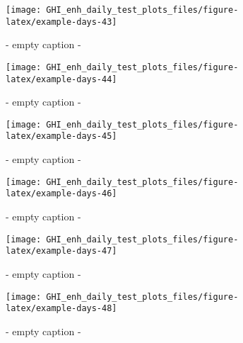 \documentclass[
  10pt,
  a4paper,oneside]{article}
\begin{document}
\begin{figure}[H]

{\centering \texttt{[image: GHI\_enh\_daily\_test\_plots\_files/figure-latex/example-days-43]} 

}

\caption{ - empty caption - }\label{fig:example-days-43}
\end{figure}

\begin{figure}[H]

{\centering \texttt{[image: GHI\_enh\_daily\_test\_plots\_files/figure-latex/example-days-44]} 

}

\caption{ - empty caption - }\label{fig:example-days-44}
\end{figure}

\begin{figure}[H]

{\centering \texttt{[image: GHI\_enh\_daily\_test\_plots\_files/figure-latex/example-days-45]} 

}

\caption{ - empty caption - }\label{fig:example-days-45}
\end{figure}

\begin{figure}[H]

{\centering \texttt{[image: GHI\_enh\_daily\_test\_plots\_files/figure-latex/example-days-46]} 

}

\caption{ - empty caption - }\label{fig:example-days-46}
\end{figure}

\begin{figure}[H]

{\centering \texttt{[image: GHI\_enh\_daily\_test\_plots\_files/figure-latex/example-days-47]} 

}

\caption{ - empty caption - }\label{fig:example-days-47}
\end{figure}

\begin{figure}[H]

{\centering \texttt{[image: GHI\_enh\_daily\_test\_plots\_files/figure-latex/example-days-48]} 

}

\caption{ - empty caption - }\label{fig:example-days-48}
\end{figure}
\end{document}
